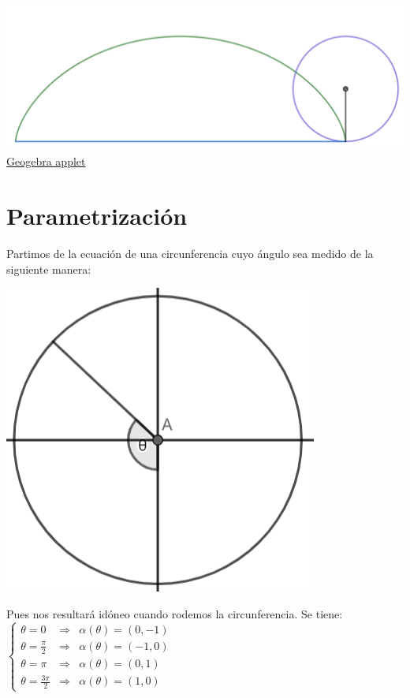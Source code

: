 \documentclass{article}
\begin{document}
\begin{center}
\begin{align*}
\end{align*}
\includegraphics[scale=0.4]{figuras/cicloide descipcion 5.PNG}\\
\href{https://www.geogebra.org/calculator/ju6wnwpc}{Geogebra applet}
\end{center}
\newpage\section{Parametrización}
Partimos de la ecuación de una circunferencia cuyo ángulo sea medido de la siguiente manera:
\begin{center}
        \includegraphics[scale=0.4]{figuras/circulo angulo.PNG}
\end{center} Pues nos resultará idóneo cuando rodemos la circunferencia. Se tiene:\\
$\left\{\begin{array}{lll}
    \theta = 0 & \Rightarrow & \alpha(\theta)=(0,-1) \\
    \theta = \frac{\pi}{2} & \Rightarrow & \alpha(\theta)=(-1,0) \\
    \theta = \pi & \Rightarrow & \alpha(\theta)=(0,1) \\
    \theta = \frac{3\pi}{2} & \Rightarrow & \alpha(\theta)=(1,0)
\end{array}\right.$
\end{document}
